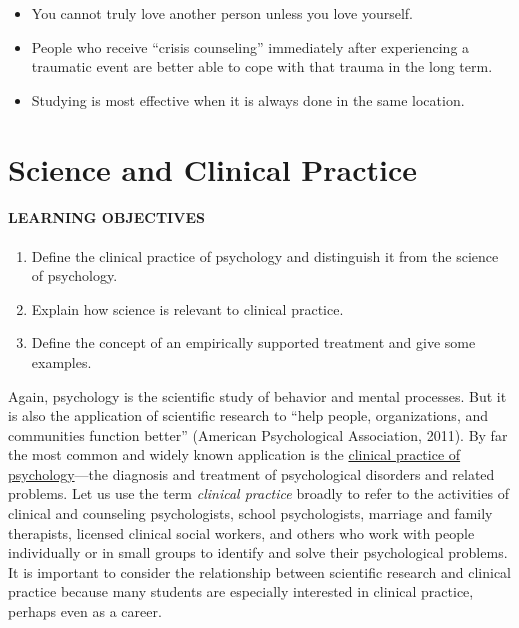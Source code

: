 \documentclass[
]{krantz}
\providecommand{\tightlist}{%
  \setlength{\itemsep}{0pt}\setlength{\parskip}{0pt}}
\begin{document}
\begin{itemize}
\tightlist
\item
  You cannot truly love another person unless you love yourself.
\item
  People who receive ``crisis counseling'' immediately after experiencing a traumatic event are better able to cope with that trauma in the long term.
\item
  Studying is most effective when it is always done in the same location.
\end{itemize}

\hypertarget{science-and-clinical-practice}{%
\section{Science and Clinical Practice}\label{science-and-clinical-practice}}

\hypertarget{learning-objectives-3}{%
\paragraph*{LEARNING OBJECTIVES}\label{learning-objectives-3}}

\begin{enumerate}
\def\labelenumi{\arabic{enumi}.}
\tightlist
\item
  Define the clinical practice of psychology and distinguish it from the science of psychology.
\item
  Explain how science is relevant to clinical practice.
\item
  Define the concept of an empirically supported treatment and give some examples.
\end{enumerate}

Again, psychology is the scientific study of behavior and mental processes. But it is also the application of scientific research to ``help people, organizations, and communities function better'' (American Psychological Association, 2011). By far the most common and widely known application is the \protect\hyperlink{clinical-practice-of-psychology}{clinical practice of psychology}---the diagnosis and treatment of psychological disorders and related problems. Let us use the term \emph{clinical practice} broadly to refer to the activities of clinical and counseling psychologists, school psychologists, marriage and family therapists, licensed clinical social workers, and others who work with people individually or in small groups to identify and solve their psychological problems. It is important to consider the relationship between scientific research and clinical practice because many students are especially interested in clinical practice, perhaps even as a career.
\end{document}
